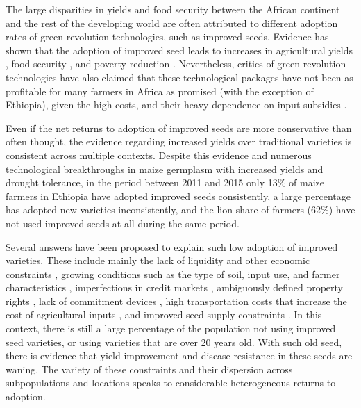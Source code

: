 \documentclass[11pt]{article}
\begin{document}
The large disparities in yields and food security between the African continent and the rest of the developing world are often attributed to different adoption rates of green revolution technologies, such as improved seeds. Evidence has shown that the adoption of improved seed leads to increases in agricultural yields \citep{Carter2014-fm}, food security \citep{Shiferaw2014-op}, and poverty reduction \citep{Minten2008-tj}. Nevertheless, critics of green revolution technologies have also claimed that these technological packages have not been as profitable for many farmers in Africa as promised (with the exception of Ethiopia), given the high costs, and their heavy dependence on input subsidies \citep{Wise20}. \par
Even if the net returns to adoption of improved seeds are more conservative than often thought, the evidence regarding increased yields over traditional varieties is consistent across multiple contexts. Despite this evidence and numerous technological breakthroughs in maize germplasm with increased yields and drought tolerance, in the period between 2011 and 2015 only 13\% of maize farmers in Ethiopia have adopted improved seeds consistently, a large percentage has adopted new varieties inconsistently, and the lion share of farmers (62\%) have not used improved seeds at all during the same period. 

Several answers have been proposed to explain such low adoption of improved varieties. These include mainly the lack of liquidity and other economic constraints \citep{Carter2014-fm}, growing conditions such as the type of soil, input use, and farmer characteristics \citep{Munshi2004-og}, imperfections in credit markets \citep{Croppenstedt2003-pq}, ambiguously defined property rights \citep{Place2000-el}, lack of commitment devices \cite{Duflo2009-iv}, high transportation costs that increase the cost of agricultural inputs \citep{Byerlee2013-qk}, and improved seed supply constraints \citep{Bird2020-nt}. In this context, there is still a large percentage of the population not using improved seed varieties, or using varieties that are over 20 years old. With such old seed, there is evidence that yield improvement and disease resistance in these seeds are waning\citep{Abate2015-rj}. The variety of these constraints and their dispersion across subpopulations and locations speaks to considerable heterogeneous returns to adoption.      

\end{document}
